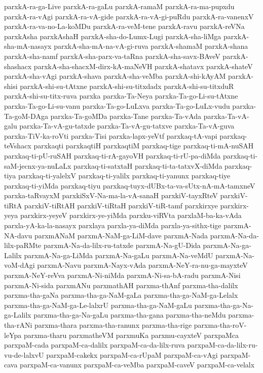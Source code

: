 {parxkA-ra-ga-Live
parxkA-ra-gaLu
parxkA-ramaM
parxkA-ra-ma-pupxdu
parxkA-ra-vAgi
parxkA-ra-vA-gide
parxkA-ra-vA-gi-puRdu
parxkA-ra-vanenxV
parxkA-ra-va-no-La-koMDu
parxkA-ra-veM-tene
parxkA-ravu
parxkA-reVNa
parxkAsha
parxkAshaH
parxkA-sha-do-Lumx-Lugi
parxkA-sha-liMga
parxkA-sha-mA-nasayx
parxkA-sha-mA-na-vA-gi-ruva
parxkA-shamaM
parxkA-shana
parxkA-sha-namf
parxkA-sha-parx-va-taRna
parxkA-sha-savx-BAveV
parxkA-shashacx
parxkA-sha-shacxM-dirx-kA-maNeVH
parxkA-shatavx
parxkA-shateV
parxkA-sha-vAgi
parxkA-shava
parxkA-sha-veMba
parxkA-shi-kAyAM
parxkA-shisi
parxkA-shi-su-tAtxne
parxkA-shi-su-titxdadx
parxkA-shi-su-titxduR
parxkA-shi-su-titx-ruva
parxka
parxka-Ta-Neya
parxka-Ta-go-Li-su-tAtxne
parxka-Ta-go-Li-su-vanu
parxka-Ta-go-LuLxva
parxka-Ta-go-LuLx-vudu
parxka-Ta-goM-DAga
parxka-Ta-goMDa
parxka-Tane
parxka-Ta-vAda
parxka-Ta-vA-galu
parxka-Ta-vA-gu-tatxde
parxka-Ta-vA-gu-tatxve
parxka-Ta-vA-guva
parxka-TiV-ka-roVti
parxka-Tisi
parxka-lapx-yeVtf
parxkaq-tA-vapi
parxkaq-teVshacx
parxkaqti
parxkaqtiH
parxkaqtiM
parxkaq-tige
parxkaq-ti-mA-nuSAH
parxkaq-ti-pU-ruSAH
parxkaq-ti-rA-gayoVH
parxkaq-ti-rU-pa-diMda
parxkaq-ti-saM-jecnx-ya-nuLaLx
parxkaq-ti-satxtaH
parxkaq-ti-ta-tatxvX-diMda
parxkaq-tiya
parxkaq-ti-yalelxV
parxkaq-ti-yalilx
parxkaq-ti-yanunx
parxkaq-tiye
parxkaq-ti-yiMda
parxkaq-tiyu
parxkaq-tuyx-dUBx-ta-va-sUtx-nA-mA-tamxneV
parxka-taRvayxM
parxkiSxV-Na-ma-la-vA-sanaH
parxkiV-tayxRteV
parxkiV-tiRtA
parxkiV-tiRtAH
parxkiV-tiRtaH
parxkiV-tiR-tamf
parxkirxye
parxkirx-yeya
parxkirx-yeyeV
parxkirx-ye-yiMda
parxku-viRVta
parxlaM-ba-ka-vAda
parxla-yA-ka-la-nasayx
parxlaya
parxla-ya-diMda
parxla-ya-sithx-tige
parxmA-NA-davu
parxmANaM
parxmA-NaM-ga-LiM-dave
parxmA-Nada
parxmA-Na-da-lilx-paRMte
parxmA-Na-da-lilx-ru-tatxde
parxmA-Na-gU-Dida
parxmA-Na-ga-Lalilx
parxmA-Na-ga-LiMda
parxmA-Na-gaLu
parxmA-Na-veMdU
parxmA-Na-voM-dAgi
parxmA-Navu
parxmA-Nayx-vAda
parxmA-NeY-ra-nu-ga-mayxteV
parxmA-NeY-reVva
parxmA-Ni-niMda
parxmA-Ni-sa-bA-radu
parxmA-Nisi
parxmA-Ni-sida
parxmANu
parxmathAH
parxma-thAnf
parxma-tha-dalilx
parxma-tha-gaNa
parxma-tha-ga-NaM-gaLa
parxma-tha-ga-NaM-ga-Lelalx
parxma-tha-ga-NaM-ga-Le-lalxrU
parxma-tha-ga-NaM-gaLu
parxma-tha-ga-Na-ga-Lalilx
parxma-tha-ga-Na-gaLu
parxma-tha-gana
parxma-tha-neMdu
parxma-tha-rANi
parxma-thara
parxma-tha-ranunx
parxma-tha-rige
parxma-tha-roV-leYpa
parxma-tharu
parxmatheVM
parxmuKa
parxmu-cayxteV
parxpaMca
parxpaM-cada
parxpaM-ca-dalilx
parxpaM-ca-da-lilx-ruva
parxpaM-ca-da-lilx-ru-vu-de-lalxvU
parxpaM-cakekx
parxpaM-ca-rUpaM
parxpaM-ca-vAgi
parxpaM-cava
parxpaM-ca-vanunx
parxpaM-ca-veMba
parxpaM-caveV
parxpaM-ca-velalx
}
